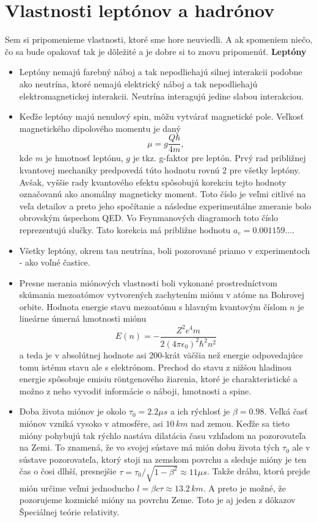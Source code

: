 \documentclass[../../main.tex]{subfiles}
\begin{document}
\section{Vlastnosti leptónov a hadrónov}
Sem si pripomenieme vlastnosti, ktoré sme hore neuviedli. A ak spomeniem niečo, čo sa bude opakovať tak je dôležité a je dobre si to znovu pripomenúť.\newline
\textbf{Leptóny}
\begin{itemize}

\item Leptóny nemajú farebný náboj a tak nepodliehajú silnej interakcii podobne ako neutrína, ktoré nemajú elektrický náboj a tak nepodliehajú elektromagnetickej interakcii. Neutrína interagujú jedine slabou interakciou.
\item Keďže leptóny majú nenulový spin, môžu vytvárať magnetické pole. Veľkosť magnetického dipolového momentu je daný 
$$\mu=g\frac{Q\hbar}{4m},$$ kde $m$ je hmotnosť leptónu, $g$ je tkz. g-faktor pre leptón. Prvý rad približnej kvantovej mechaniky predpovedá túto hodnotu rovnú 2 pre všetky leptóny. Avšak, vyššie rady kvantového efektu spôsobujú korekciu tejto hodnoty označovanú ako anomálny magneticky moment. Toto číslo je veľmi citlivé na veľa detailov a preto jeho spočítanie a následne experimentálne zmeranie bolo obrovským úspechom QED. Vo Feynmanových diagramoch toto číslo reprezentujú slučky. Tato korekcia má približne hodnotu $a_e=0.001159....$ 
\item Všetky leptóny, okrem tau neutrína, boli pozorované priamo v experimentoch - ako voľné častice.
\item Presne merania miónových vlastnosti boli vykonané prostredníctvom skúmania mezoatómov vytvorených zachytením miónu v atóme na Bohrovej orbite. Hodnota energie stavu mezoatómu s hlavným kvantovým číslom $n$ je lineárne úmerná hmotnosti miónu $$E(n)=-\frac{Z^2e^4m}{2(4\pi\epsilon_0)^2\hbar^2n^2}$$ a teda je v absolútnej hodnote asi 200-krát väčšia než energie odpovedajúce tomu istému stavu ale s elektrónom. Prechod do stavu z nižšou hladinou energie spôsobuje emisiu röntgenového žiarenia, ktoré je charakteristické a možno z neho vyvodiť informácie o náboji, hmotnosti a spine.
\item Doba života miónov je okolo $\tau_0=2.2\mu s$ a ich rýchlosť je $\beta=0.98$. Veľká časť miónov vzniká vysoko v atmosfére, asi $10\,km$ nad zemou. Keďže sa tieto mióny pohybujú tak rýchlo nastáva dilatácia času vzhľadom na pozorovateľa na Zemi. To znamená, že vo svojej sústave má mión dobu života tých $\tau_0$ ale v sústave pozorovateľa, ktorý stoji na zemskom povrchu a sleduje mióny je ten čas o čosi dlhší, presnejšie $\tau=\tau_0/\sqrt{1-\beta^2}\approx11\mu s$. Takže dráhu, ktorú prejde mión určime veľmi jednoducho  $l=\beta c\tau \approx 13.2\,km$. A preto je možné, že pozorujeme kozmické mióny na povrchu Zeme. Toto je aj jeden z dôkazov Špeciálnej teórie relativity.

\end{itemize}
\end{document}

